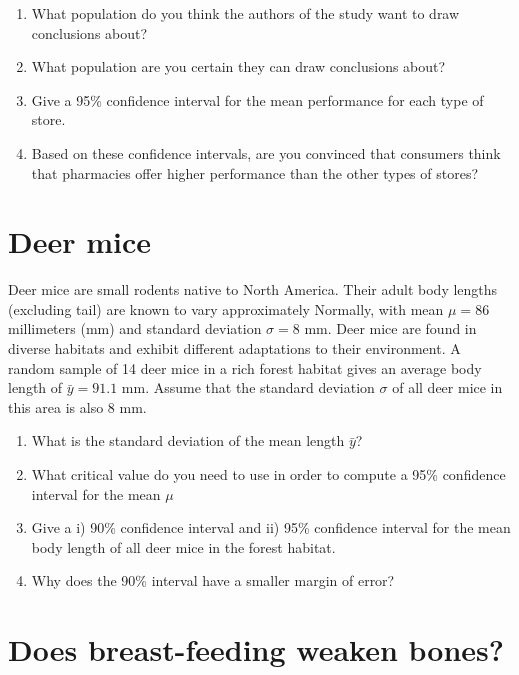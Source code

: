 \documentclass[letterpaper,9pt,twoside,printwatermark=false]{pinp}
\providecommand{\tightlist}{%
  \setlength{\itemsep}{0pt}\setlength{\parskip}{0pt}}
\begin{document}
\begin{enumerate}
\def\labelenumi{\alph{enumi}.}
\tightlist
\item
  What population do you think the authors of the study want to draw
  conclusions about?
\item
  What population are you certain they can draw conclusions about?
\item
  Give a 95\% confidence interval for the mean performance for each type
  of store.
\item
  Based on these confidence intervals, are you convinced that consumers
  think that pharmacies offer higher performance than the other types of
  stores?
\end{enumerate}

\section{Deer mice}\label{deer-mice}

Deer mice are small rodents native to North America. Their adult body
lengths (excluding tail) are known to vary approximately Normally, with
mean \(\mu = 86\) millimeters (mm) and standard deviation \(\sigma=8\)
mm. Deer mice are found in diverse habitats and exhibit different
adaptations to their environment. A random sample of 14 deer mice in a
rich forest habitat gives an average body length of \(\bar{y} = 91.1\)
mm. Assume that the standard deviation \(\sigma\) of all deer mice in
this area is also 8 mm.

\begin{enumerate}
\def\labelenumi{\alph{enumi}.}
\tightlist
\item
  What is the standard deviation of the mean length \(\bar{y}\)?
\item
  What critical value do you need to use in order to compute a 95\%
  confidence interval for the mean \(\mu\)
\item
  Give a i) 90\% confidence interval and ii) 95\% confidence interval
  for the mean body length of all deer mice in the forest habitat.
\item
  Why does the 90\% interval have a smaller margin of error?
\end{enumerate}

\section{Does breast-feeding weaken
bones?}\label{does-breast-feeding-weaken-bones}
\end{document}
